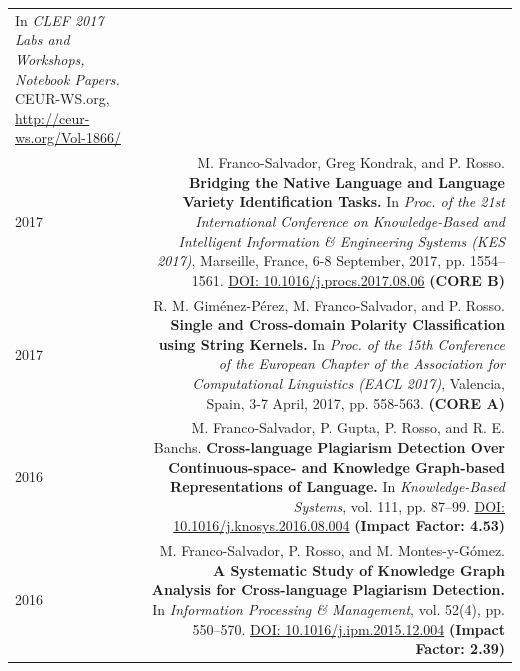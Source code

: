 \documentclass[10pt]{article}
\begin{document}
\begin{tabular}{L!{\VRule}R}
	In \emph{CLEF 2017 Labs and Workshops, Notebook Papers.} CEUR-WS.org, \href{http://ceur-ws.org/Vol-1866/}{http://ceur-ws.org/Vol-1866/} \vspace{5pt}\\
    2017&M. Franco-Salvador, Greg Kondrak, and P. Rosso. \textbf{Bridging the Native Language and Language Variety Identification Tasks.}
	In \emph{Proc. of the 21st International Conference on Knowledge-Based and Intelligent Information \& Engineering Systems (KES 2017)}, Marseille, France, 6-8 September, 2017, pp. 1554--1561. \href{https://doi.org/10.1016/j.procs.2017.08.068}{DOI: 10.1016/j.procs.2017.08.06} \textbf{(CORE B)}\vspace{5pt}\\
	2017&R. M. Gim{\'e}nez-P{\'e}rez, M. Franco-Salvador, and P. Rosso. \textbf{Single and Cross-domain Polarity Classification using String Kernels.}
	In \emph{Proc. of the 15th Conference of the European Chapter of the Association for Computational Linguistics (EACL 2017)}, Valencia, Spain, 3-7 April, 2017, pp. 558-563. \textbf{(CORE A)}\vspace{5pt}\\	
	2016&M. Franco-Salvador, P. Gupta, P. Rosso, and R. E. Banchs. \textbf{Cross-language Plagiarism Detection Over Continuous-space- and Knowledge Graph-based Representations of Language.}
	In \emph{Knowledge-Based Systems}, vol. 111, pp. 87--99. \href{http://dx.doi.org/10.1016/j.knosys.2016.08.004}{DOI: 10.1016/j.knosys.2016.08.004} \textbf{(Impact Factor: 4.53)} \vspace{5pt}\\
	2016&M. Franco-Salvador, P. Rosso, and M. Montes-y-G{\'o}mez. \textbf{A Systematic Study of Knowledge Graph Analysis for Cross-language Plagiarism Detection.}
	In \emph{Information Processing \& Management}, vol. 52(4), pp. 550--570. \href{http://dx.doi.org/10.1016/j.ipm.2015.12.004}{DOI: 10.1016/j.ipm.2015.12.004} \textbf{(Impact Factor: 2.39)} \vspace{5pt}\\
\end{tabular}
\end{document}

